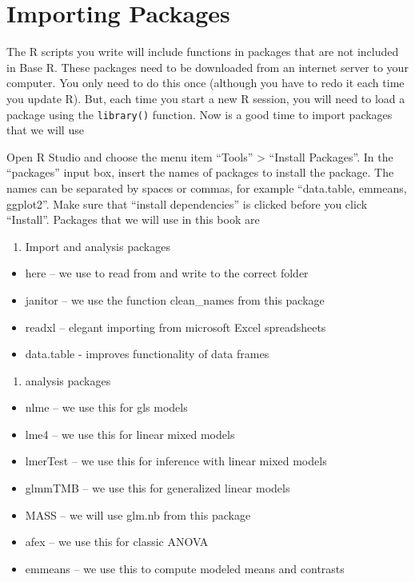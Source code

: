 \documentclass[]{book}
\providecommand{\tightlist}{%
  \setlength{\itemsep}{0pt}\setlength{\parskip}{0pt}}
\begin{document}
\hypertarget{importing-packages}{%
\section{Importing Packages}\label{importing-packages}}

The R scripts you write will include functions in packages that are not included in Base R. These packages need to be downloaded from an internet server to your computer. You only need to do this once (although you have to redo it each time you update R). But, each time you start a new R session, you will need to load a package using the \texttt{library()} function. Now is a good time to import packages that we will use

Open R Studio and choose the menu item ``Tools'' \textgreater{} ``Install Packages''. In the ``packages'' input box, insert the names of packages to install the package. The names can be separated by spaces or commas, for example ``data.table, emmeans, ggplot2''. Make sure that ``install dependencies'' is clicked before you click ``Install''. Packages that we will use in this book are

\begin{enumerate}
\def\labelenumi{\arabic{enumi}.}
\tightlist
\item
  Import and analysis packages
\end{enumerate}

\begin{itemize}
\tightlist
\item
  here -- we use to read from and write to the correct folder
\item
  janitor -- we use the function clean\_names from this package
\item
  readxl -- elegant importing from microsoft Excel spreadsheets
\item
  data.table - improves functionality of data frames
\end{itemize}

\begin{enumerate}
\def\labelenumi{\arabic{enumi}.}
\setcounter{enumi}{1}
\tightlist
\item
  analysis packages
\end{enumerate}

\begin{itemize}
\tightlist
\item
  nlme -- we use this for gls models
\item
  lme4 -- we use this for linear mixed models
\item
  lmerTest -- we use this for inference with linear mixed models
\item
  glmmTMB -- we use this for generalized linear models
\item
  MASS -- we will use glm.nb from this package
\item
  afex -- we use this for classic ANOVA
\item
  emmeans -- we use this to compute modeled means and contrasts
\end{itemize}
\end{document}
